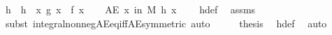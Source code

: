 \begin{isabellebody}
\ h\ \ {\isachardoublequoteopen}h\ {\isacharequal}{\kern0pt}\ {\isacharparenleft}{\kern0pt}{\isasymlambda}x{\isachardot}{\kern0pt}\ g\ x\ {\isacharminus}{\kern0pt}\ f\ x{\isacharparenright}{\kern0pt}{\isachardoublequoteclose}\isanewline
\ \ \isamarkupfalse%
\ {\isachardoublequoteopen}AE\ x\ in\ M{\isachardot}{\kern0pt}\ h\ x\ {\isacharequal}{\kern0pt}\ {}{\isachardoublequoteclose}\ \isamarkupfalse%
\ h{\isacharunderscore}{\kern0pt}def\ \isamarkupfalse%
\ assms\ \isamarkupfalse%
\ {\isacharparenleft}{\kern0pt}subst\ integral{\isacharunderscore}{\kern0pt}nonneg{\isacharunderscore}{\kern0pt}AE{\isacharunderscore}{\kern0pt}eq{\isacharunderscore}{\kern0pt}{}{\isacharunderscore}{\kern0pt}iff{\isacharunderscore}{\kern0pt}AE{\isacharbrackleft}{\kern0pt}symmetric{\isacharbrackright}{\kern0pt}{\isacharparenright}{\kern0pt}\ auto\isanewline
\ \ \isamarkupfalse%
\ \isamarkupfalse%
\ {\isacharquery}{\kern0pt}thesis\ \isamarkupfalse%
\ h{\isacharunderscore}{\kern0pt}def\ \isamarkupfalse%
\ auto\isanewline
{}\isamarkupfalse%
%
\endisatagproof
{\isafoldproof}%
%
\isadelimproof
\isanewline
%
\endisadelimproof
\isanewline
{}\isamarkupfalse%
\isanewline
%
\isadelimtheory
\isanewline
%
\endisadelimtheory
%
\isatagtheory
{}\isamarkupfalse%
%
\endisatagtheory
{\isafoldtheory}%
%
\isadelimtheory
%
\endisadelimtheory
%
\end{isabellebody}%
\endinput
